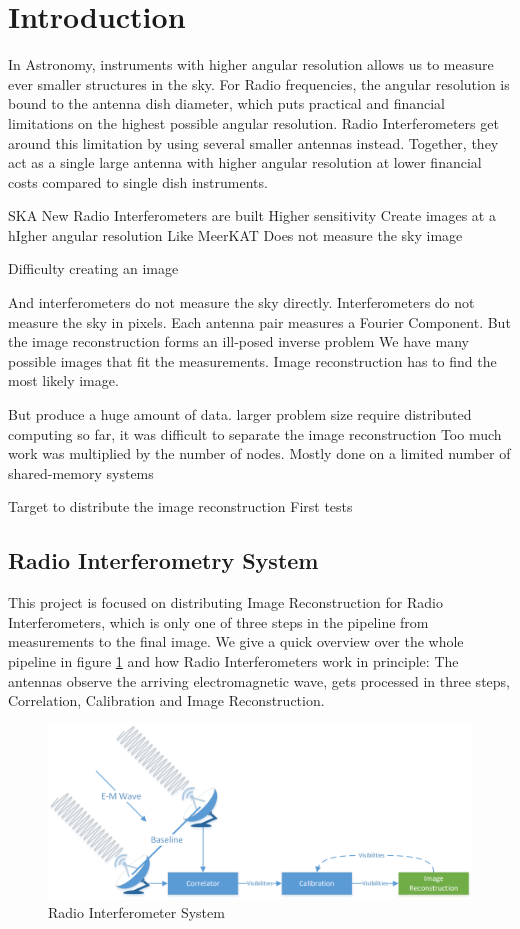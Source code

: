 \section{Introduction}
In Astronomy, instruments with higher angular resolution allows us to measure ever smaller structures in the sky. For Radio frequencies, the angular resolution is bound to the antenna dish diameter, which puts practical and financial limitations on the highest possible angular resolution. Radio Interferometers get around this limitation by using several smaller antennas instead. Together, they act as a single large antenna with higher angular resolution at lower financial costs compared to single dish instruments.

SKA
New Radio Interferometers are built
Higher sensitivity
Create images at a hIgher angular resolution
Like MeerKAT
Does not measure the sky image

Difficulty creating an image

And interferometers do not measure the sky directly. Interferometers do not measure the sky in pixels. Each antenna pair measures a Fourier Component. 
But the image reconstruction forms an ill-posed inverse problem
We have many possible images that fit the measurements.
Image reconstruction has to find the most likely image.

But produce a huge amount of data.
larger problem size require distributed computing
so far, it was difficult to separate the image reconstruction
Too much work was multiplied by the number of nodes.
Mostly done on a limited number of shared-memory systems

Target to distribute the image reconstruction
First tests


\subsection{Radio Interferometry System}
This project is focused on distributing Image Reconstruction for Radio Interferometers, which is only one of three steps in the pipeline from measurements to the final image. We give a quick overview over the whole pipeline in figure \ref{intro:system} and how Radio Interferometers work in principle: The antennas observe the arriving electromagnetic wave, gets processed in three steps, Correlation, Calibration and Image Reconstruction. 

\begin{figure}[h]
	\centering
	\includegraphics[width=0.80\linewidth]{./chapters/01.intro/system.png}
	\caption{Radio Interferometer System}
	\label{intro:system}
\end{figure}

